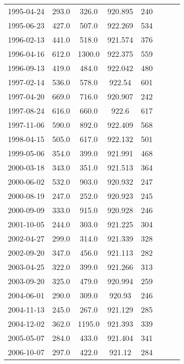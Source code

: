 \documentclass[12pt,letterpaper]{article}
\begin{document}
\begin{longtable}{cccccccc}
	1995-04-24 & 293.0 & 326.0 & 920.895 & 240 & {\checkmark} &  &  \\
	1995-06-23 & 427.0 & 507.0 & 922.269 & 534 & {\checkmark} &  &  \\
	1996-02-13 & 441.0 & 518.0 & 921.574 & 376 & {\checkmark} &  &  \\
	1996-04-16 & 612.0 & 1300.0 & 922.375 & 559 & {\checkmark} &  & {\checkmark} \\
	1996-09-13 & 419.0 & 484.0 & 922.042 & 480 & {\checkmark} &  & {\checkmark} \\
	1997-02-14 & 536.0 & 578.0 & 922.54 & 601 & {\checkmark} &  & {\checkmark} \\
	1997-04-20 & 669.0 & 716.0 & 920.907 & 242 & {\checkmark} &  &  \\
	1997-08-24 & 616.0 & 660.0 & 922.6 & 617 & {\checkmark} &  & {\checkmark} \\
	1997-11-06 & 590.0 & 892.0 & 922.409 & 568 & {\checkmark} &  &  \\
	1998-04-15 & 505.0 & 617.0 & 922.132 & 501 & {\checkmark} &  & {\checkmark} \\
	1999-05-06 & 354.0 & 399.0 & 921.991 & 468 & {\checkmark} &  & {\checkmark} \\
	2000-03-18 & 343.0 & 351.0 & 921.513 & 364 & {\checkmark} &  &  \\
	2000-06-02 & 532.0 & 903.0 & 920.932 & 247 &  &  &  \\
	2000-08-19 & 247.0 & 252.0 & 920.923 & 245 & {\checkmark} &  &  \\
	2000-09-09 & 333.0 & 915.0 & 920.928 & 246 &  & {\checkmark} &  \\
	2001-10-05 & 244.0 & 303.0 & 921.225 & 304 &  &  &  \\
	2002-04-27 & 299.0 & 314.0 & 921.339 & 328 &  & {\checkmark} &  \\
	2002-09-20 & 347.0 & 456.0 & 921.113 & 282 &  &  &  \\
	2003-04-25 & 322.0 & 399.0 & 921.266 & 313 &  &  &  \\
	2003-09-20 & 325.0 & 479.0 & 920.994 & 259 &  &  &  \\
	2004-06-01 & 290.0 & 309.0 & 920.93 & 246 &  & {\checkmark} &  \\
	2004-11-13 & 245.0 & 267.0 & 921.129 & 285 &  & {\checkmark} &  \\
	2004-12-02 & 362.0 & 1195.0 & 921.393 & 339 &  & {\checkmark} &  \\
	2005-05-07 & 284.0 & 433.0 & 921.404 & 341 &  &  &  \\
	2006-10-07 & 297.0 & 422.0 & 921.12 & 284 &  &  &  \\

\end{longtable}
\end{document}
